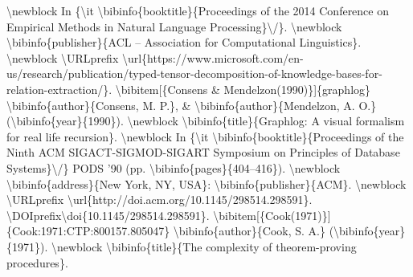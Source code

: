 \documentclass{article}%
\begin{document}
\textbackslash{}newblock In \{\textbackslash{}it \textbackslash{}bibinfo\{booktitle\}\{Proceedings of the 2014 Conference on\newline%
Empirical Methods in Natural Language Processing\}\textbackslash{}/\}.\newline%
\textbackslash{}newblock \textbackslash{}bibinfo\{publisher\}\{ACL – Association for Computational\newline%
Linguistics\}.\newline%
\textbackslash{}newblock \textbackslash{}URLprefix\newline%
\textbackslash{}url\{https://www.microsoft.com/en{-}us/research/publication/typed{-}tensor{-}decomposition{-}of{-}knowledge{-}bases{-}for{-}relation{-}extraction/\}.\newline%
\textbackslash{}bibitem{[}\{Consens \& Mendelzon(1990)\}{]}\{graphlog\}\newline%
\textbackslash{}bibinfo\{author\}\{Consens, M. P.\}, \& \textbackslash{}bibinfo\{author\}\{Mendelzon, A. O.\}\newline%
(\textbackslash{}bibinfo\{year\}\{1990\}).\newline%
\textbackslash{}newblock \textbackslash{}bibinfo\{title\}\{Graphlog: A visual formalism for real life\newline%
recursion\}.\newline%
\textbackslash{}newblock In \{\textbackslash{}it \textbackslash{}bibinfo\{booktitle\}\{Proceedings of the Ninth ACM\newline%
SIGACT{-}SIGMOD{-}SIGART Symposium on Principles of Database Systems\}\textbackslash{}/\} PODS '90\newline%
(pp. \textbackslash{}bibinfo\{pages\}\{404–416\}).\newline%
\textbackslash{}newblock \textbackslash{}bibinfo\{address\}\{New York, NY, USA\}: \textbackslash{}bibinfo\{publisher\}\{ACM\}.\newline%
\textbackslash{}newblock \textbackslash{}URLprefix \textbackslash{}url\{http://doi.acm.org/10.1145/298514.298591\}.\newline%
\textbackslash{}DOIprefix\textbackslash{}doi\{10.1145/298514.298591\}.\newline%
\textbackslash{}bibitem{[}\{Cook(1971)\}{]}\{Cook:1971:CTP:800157.805047\}\newline%
\textbackslash{}bibinfo\{author\}\{Cook, S. A.\} (\textbackslash{}bibinfo\{year\}\{1971\}).\newline%
\textbackslash{}newblock \textbackslash{}bibinfo\{title\}\{The complexity of theorem{-}proving procedures\}.\newline%
\end{document}
